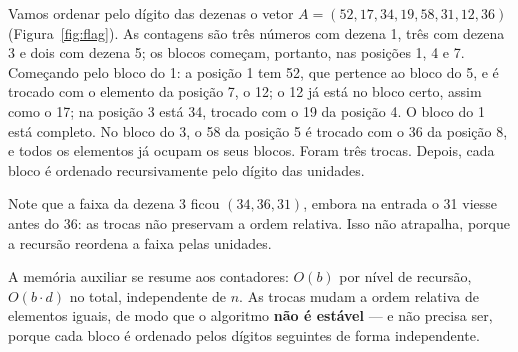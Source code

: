\begin{exemplo}\label{ex:flag}
Vamos ordenar pelo dígito das dezenas o vetor $A=(52,17,\allowbreak34,19,\allowbreak58,31,\allowbreak12,36)$ (Figura~\ref{fig:flag}). As contagens são três números com dezena 1, três com dezena 3 e dois com dezena 5; os blocos começam, portanto, nas posições 1, 4 e 7. Começando pelo bloco do 1: a posição 1 tem 52, que pertence ao bloco do 5, e é trocado com o elemento da posição 7, o 12; o 12 já está no bloco certo, assim como o 17; na posição 3 está 34, trocado com o 19 da posição 4. O bloco do 1 está completo. No bloco do 3, o 58 da posição 5 é trocado com o 36 da posição 8, e todos os elementos já ocupam os seus blocos. Foram três trocas. Depois, cada bloco é ordenado recursivamente pelo dígito das unidades.
\begin{figura}
\end{figura}
Note que a faixa da dezena 3 ficou $(34,36,31)$, embora na entrada o 31 viesse antes do 36: as trocas não preservam a ordem relativa. Isso não atrapalha, porque a recursão reordena a faixa pelas unidades.
\end{exemplo}

A memória auxiliar se resume aos contadores: $O(b)$ por nível de recursão, $O(b\cdot d)$ no total, independente de $n$. As trocas mudam a ordem relativa de elementos iguais, de modo que o algoritmo \textbf{não é estável} --- e não precisa ser, porque cada bloco é ordenado pelos dígitos seguintes de forma independente.


